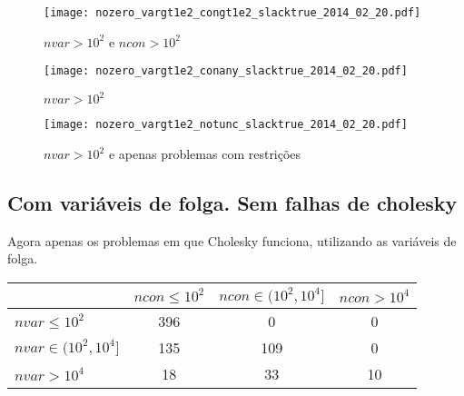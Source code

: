 \documentclass{article}
\begin{document}
\begin{figure}[H]
\centering
\texttt{[image: nozero\_vargt1e2\_congt1e2\_slacktrue\_2014\_02\_20.pdf]}
\caption{ $nvar > 10^2$ e $ncon > 10^2$ }
\label{fig:both_medium_and_big}
\end{figure}

\begin{figure}[H]
\centering
\texttt{[image: nozero\_vargt1e2\_conany\_slacktrue\_2014\_02\_20.pdf]}
\caption{ $nvar > 10^2$ }
\label{fig:nvar_medium_and_big}
\end{figure}

\begin{figure}[H]
\centering
\texttt{[image: nozero\_vargt1e2\_notunc\_slacktrue\_2014\_02\_20.pdf]}
\caption{ $nvar > 10^2$ e apenas problemas com restrições }
\label{fig:nvar_medium_and_big_not_unc}
\end{figure}

\newpage
\subsection{Com variáveis de folga. Sem falhas de cholesky}

Agora apenas os problemas em que Cholesky funciona, utilizando as variáveis de
folga.
\begin{center}
\begin{tabular}{|l|c|c|c|} \hline
& $ncon \leq 10^2$ & $ncon \in (10^2,10^4]$ & $ncon > 10^4$ \\ \hline
$nvar \leq 10^2$       & 396 &   0 &  0 \\ \hline
$nvar \in (10^2,10^4]$ & 135 & 109 &  0 \\ \hline
$nvar > 10^4$          &  18 &  33 & 10 \\ \hline
\end{tabular}
\end{center}
\end{document}
